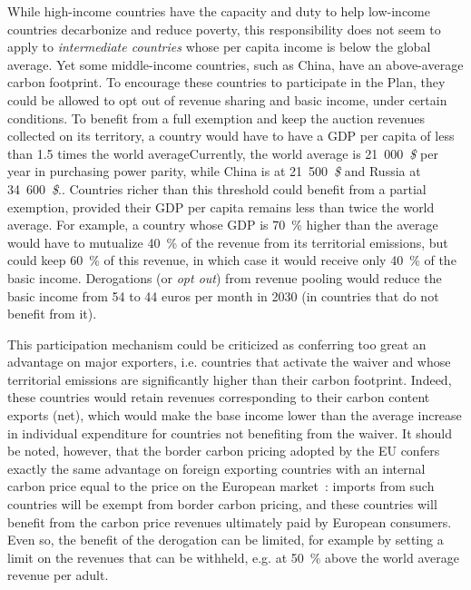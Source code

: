 \documentclass[a5paper,french,openany]{memoir}
\begin{document}
While high-income countries have the capacity and duty to help low-income countries decarbonize and reduce poverty, this responsibility does not seem to apply to \textit{intermediate countries} whose per capita income is below the global average. Yet some middle-income countries, such as China, have an above-average carbon footprint. To encourage these countries to participate in the Plan, they could be allowed to opt out of revenue sharing and basic income, under certain conditions. To benefit from a full exemption and keep the auction revenues collected on its territory, a country would have to have a GDP per capita of less than 1.5 times the world average{Currently, the world average is 21~000~\textit{\$} per year in purchasing power parity, while China is at 21~500~\textit{\$} and Russia at 34~600~\textit{\$}.}. 
Countries richer than this threshold could benefit from a partial exemption, provided their GDP per capita remains less than twice the world average. For example, a country whose GDP is 70~\% higher than the average would have to mutualize 40~\% of the revenue from its territorial emissions, but could keep 60~\% of this revenue, in which case it would receive only 40~\% of the basic income. Derogations (or \textit{opt out}) from revenue pooling would reduce the basic income from 54 to 44 euros per month in 2030 (in countries that do not benefit from it). 

This participation mechanism could be criticized as conferring too great an advantage on major exporters, i.e. countries that activate the waiver and whose territorial emissions are significantly higher than their carbon footprint. Indeed, these countries would retain revenues corresponding to their carbon content exports (net), which would make the base income lower than the average increase in individual expenditure for countries not benefiting from the waiver. It should be noted, however, that the border carbon pricing adopted by the EU confers exactly the same advantage on foreign exporting countries with an internal carbon price equal to the price on the European market~: imports from such countries will be exempt from border carbon pricing, and these countries will benefit from the carbon price revenues ultimately paid by European consumers. Even so, the benefit of the derogation can be limited, for example by setting a limit on the revenues that can be withheld, e.g. at 50~\% above the world average revenue per adult. %
\end{document}
